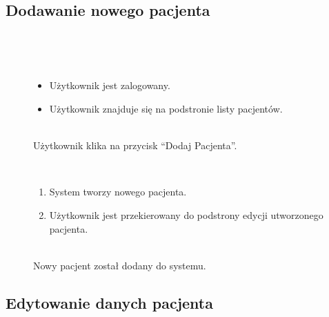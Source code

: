 \documentclass[11pt]{aghdpl}
\begin{document}
\subsection{Dodawanie nowego pacjenta}

	\begin{description}
		\item[\useCaseAktor] \hfill \\
			\useCaseUzytkownik
		\item[\useCaseWarPocz] \hfill \\
			\begin{itemize}
				\item Użytkownik jest zalogowany.
				\item Użytkownik znajduje się na podstronie listy pacjentów.
			\end{itemize}
		\item[\useCaseZdarzInicj] \hfill \\
			Użytkownik klika na przycisk ``Dodaj Pacjenta''.
		\item[\useCaseScenBaz] \hfill \\ 
			\begin{enumerate}
				\item System tworzy nowego pacjenta.
				\item Użytkownik jest przekierowany do podstrony edycji utworzonego pacjenta.
			\end{enumerate}
		\item[\useCaseWarKonc] \hfill \\ 
			Nowy pacjent został dodany do systemu.
	\end{description}

\subsection{Edytowanie danych pacjenta}
\end{document}
